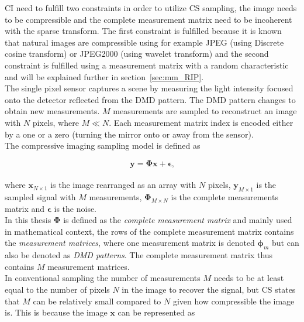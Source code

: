 CI need to fulfill two constraints in order to utilize CS sampling,  the image needs to be compressible and the complete measurement matrix need to be incoherent with the sparse transform. The first constraint is fulfilled because it is known that natural images are compressible using for example JPEG (using Discrete cosine transform) or JPEG2000 (using wavelet transform) and the second constraint is fulfilled using a measurement matrix with a random characteristic and will be explained further in section~\ref{sec:mm_RIP}.\\[0.1in]
 

The single pixel sensor captures a scene by measuring the light intensity focused onto the detector reflected from the DMD pattern. The DMD pattern changes to obtain new measurements. $M$  measurements are sampled to reconstruct an image with $N$ pixels, where $M \ll N$. Each measurement matrix index is encoded either  by a one or a zero (turning the mirror onto or away from the sensor).\\[0.1in] 

The compressive imaging sampling model is defined as

\begin{equation}
\label{eq:CS1}
   \mathbf{ y = \Phi x + \epsilon}\text{,}
\end{equation}\\[0.1in]


where $\mathbf{x}_{N\times1}$ is the image rearranged as an array with $N$ pixels, $\mathbf{y}_{M\times1}$ is the sampled signal with $M$ measurements, $\mathbf{\Phi}_{M \times N}$ is the complete measurements matrix and $\mathbf{\epsilon}$ is the noise.\\[0.1in] 

In this thesis $\mathbf{\Phi}$ is defined as the \textit{complete measurement matrix} and mainly used in mathematical context, the rows of the complete measurement matrix contains the \textit{measurement matrices}, where one measurement matrix is denoted $\mathbf{\phi}_m$ but can also be denoted as \textit{DMD patterns}. The complete measurement matrix thus contains $M$ measurement matrices.\\[0.1in]


In conventional sampling the number of measurements $M$ needs to be at least equal to the number of pixels $N$ in the image to recover the signal, but CS states that $M$ can be relatively small compared to $N$ given how compressible the image is. This is because the image $\mathbf{x}$ can be represented as  

